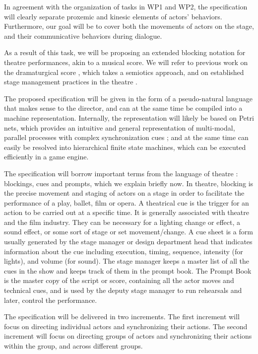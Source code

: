 In agreement with the organization of tasks in WP1 and WP2, the specification will clearly separate proxemic
and kinesic elements of actors' behaviors. Furthermore, our goal will be to cover both the movements of actors
on the stage, and their communicative behaviors during dialogue. 

As a result of this task, we will be proposing an extended blocking notation for theatre performances, akin to a musical score\cite{gagnere2012,ronfard2012,gagnere2015}. We will refer to previous work on the dramaturgical score \cite{Elam2002},
which takes a semiotics approach, and on established stage management practices in the theatre \cite{Schneider1997,Maccoy2004}.

The proposed specification will be given in the form of a pseudo-natural language that makes sense to the director, and can at the same time be compiled into a machine representation. Internally, the representation will likely be based on Petri nets, which provides an intuitive and general representation of multi-modal, parallel processes with complex synchronization cues ; and at the same time can easily be resolved into hierarchical finite state machines, which can be executed efficiently in a game engine.

The specification  will borrow important terms from the language of theatre \cite{Schneider1997,Maccoy2004}:  blockings, cues and prompts,  which we explain briefly now. In theatre, blocking is the precise movement and staging of actors on a stage in order to facilitate the performance of a play, ballet, film or opera. A theatrical cue is the trigger for an action to be carried out at a specific time. It is generally associated with theatre and the film industry. They can be necessary for a lighting change or effect, a sound effect, or some sort of stage or set movement/change. A cue sheet is a form usually generated by the stage manager or design department head that indicates information about the cue including execution, timing, sequence, intensity (for lights), and volume (for sound). The stage manager keeps a master list of all the cues in the show and keeps track of them in the prompt book. The Prompt Book is the master copy of the script or score, containing all the actor moves and technical cues,  and is used by the deputy stage manager to run rehearsals and later, control the performance.

The specification will be delivered in two increments. The first increment will focus on directing individual actors and synchronizing
their actions. The second increment will focus on directing groups of actors and synchronizing their actions  within the group, and 
across different  groups.

